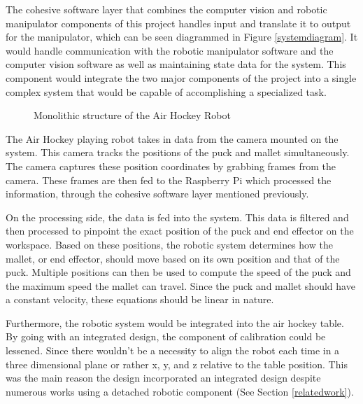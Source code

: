 \documentclass[letterpaper, 12 pt, conference]{ieeeconf}
\begin{document}
The cohesive software layer that combines the computer vision and robotic manipulator components of this project handles input and translate it to output for the manipulator, which can be seen diagrammed in Figure \ref{systemdiagram}.  It would handle communication with the robotic manipulator software and the computer vision software as well as maintaining state data for the system.  This component would integrate the two major components of the project into a single complex system that would be capable of accomplishing a specialized task.

\begin{figure}[!h]
\centering
{}
\caption{Monolithic structure of the Air Hockey Robot}
\end{figure}

The Air Hockey playing robot takes in data from the camera mounted on the system. This camera tracks the positions of the puck and mallet simultaneously. The camera captures these position coordinates by grabbing frames from the camera.
These frames are then fed to the Raspberry Pi which processed the information, through the cohesive software layer mentioned previously.

On the processing side, the data is fed into the system. This data is filtered and then processed to pinpoint the exact position of the puck and end effector on the workspace. Based on these positions, the robotic system determines how the mallet, or end effector, should move based on its own position and that of the puck.  Multiple positions can then be used to compute the speed of the puck and the maximum speed the mallet can travel. Since the puck and mallet should have a constant velocity, these equations should be linear in nature.

Furthermore, the robotic system would be integrated into the air hockey table. By going with an integrated design, the component of calibration could be lessened. Since there wouldn’t be a necessity to align the robot each time in a three dimensional plane or rather x, y, and z relative to the table position. This was the main reason the design incorporated an integrated design despite numerous works using a detached robotic component (See Section \ref{relatedwork}).
\end{document}
